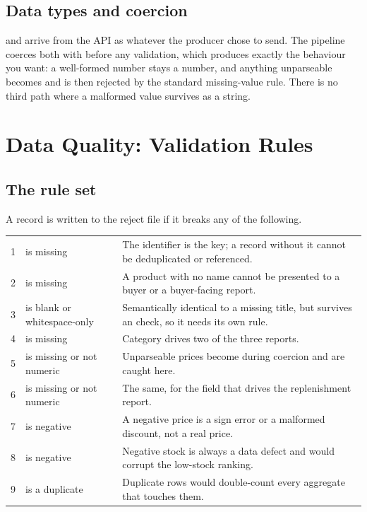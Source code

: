\subsection{Data types and coercion}
\label{sec:coercion}

 and  arrive from the API as whatever the producer
chose to send. The pipeline coerces both with  before any validation, which produces exactly the
behaviour you want: a well-formed number stays a number, and anything
unparseable becomes  and is then rejected by the standard
missing-value rule. There is no third path where a malformed value survives
as a string.

\section{Data Quality: Validation Rules}
\label{sec:validation}

\subsection{The rule set}

A record is written to the reject file if it breaks any of the following.

\noindent
\begin{tabularx}{\textwidth}{@{}L{1.2cm}L{5.6cm}Y@{}}
\thead{\#} &  &  \\
 &  is missing & The identifier is the key; a record without it cannot be deduplicated or referenced. \\
2 &  is missing & A product with no name cannot be presented to a buyer or a buyer-facing report. \\
3 &  is blank or whitespace-only & Semantically identical to a missing title, but survives an  check, so it needs its own rule. \\
4 &  is missing & Category drives two of the three reports. \\
5 &  is missing or not numeric & Unparseable prices become  during coercion and are caught here. \\
6 &  is missing or not numeric & The same, for the field that drives the replenishment report. \\
7 &  is negative & A negative price is a sign error or a malformed discount, not a real price. \\
8 &  is negative & Negative stock is always a data defect and would corrupt the low-stock ranking. \\
9 &  is a duplicate & Duplicate rows would double-count every aggregate that touches them. \\
\end{tabularx}

